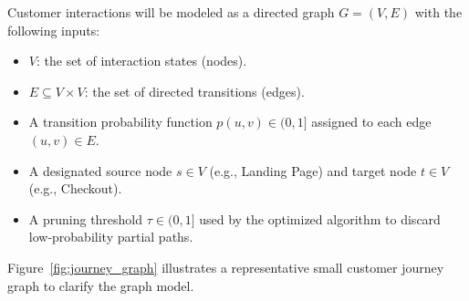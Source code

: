 Customer interactions will be modeled as a directed graph $G = (V, E)$ with the following inputs:
\begin{itemize}
    \item $V$: the set of interaction states (nodes).
    \item $E \subseteq V \times V$: the set of directed transitions (edges).
    \item A transition probability function $p(u,v) \in (0,1]$ assigned to each edge $(u,v) \in E$.
    \item A designated source node $s \in V$ (e.g., Landing Page) and target node $t \in V$ (e.g., Checkout).
    \item A pruning threshold $\tau \in (0,1]$ used by the optimized algorithm to discard low-probability partial paths.
\end{itemize}

Figure~\ref{fig:journey_graph} illustrates a representative small customer journey graph to clarify the graph model.

